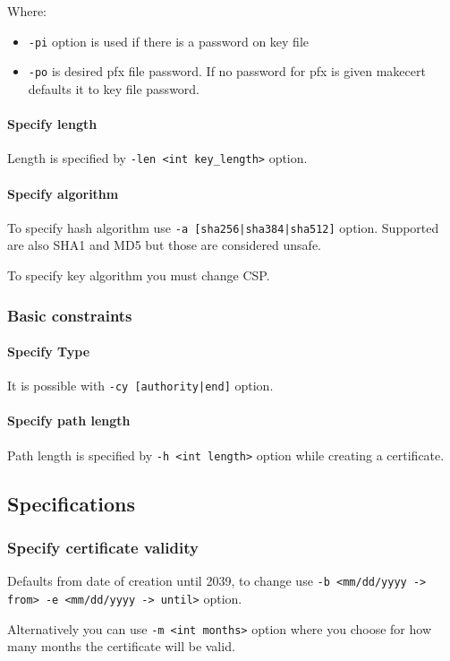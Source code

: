 \documentclass[10pt, a4paper]{report}
\begin{document}
Where:
\begin{itemize}
\item \verb+-pi+ option is used if there is a password on key file
\item \verb+-po+ is desired pfx file password. If no password for pfx is given makecert defaults it to key file password.
\end{itemize}

      \paragraph{Specify length}
Length is specified by \verb+-len <int key_length>+ option.
      \paragraph{Specify algorithm}
To specify hash algorithm use \verb+-a [sha256|sha384|sha512]+ option. Supported are also SHA1 and MD5 but those are considered unsafe.

To specify key algorithm you must change CSP.
    \subsubsection{Basic constraints}
    
      \paragraph{Specify Type}
It is possible with \verb+-cy [authority|end]+ option.

      \paragraph{Specify path length}
Path length is specified by \verb+-h <int length>+ option while creating a certificate.

  \subsection{Specifications}
  
    \subsubsection{Specify certificate validity}
Defaults from date of creation until 2039, to change use \verb+-b <mm/dd/yyyy -> from> -e <mm/dd/yyyy -> until>+ option.

Alternatively you can use \verb+-m <int months>+ option where you choose for how many months the certificate will be valid.
\end{document}

